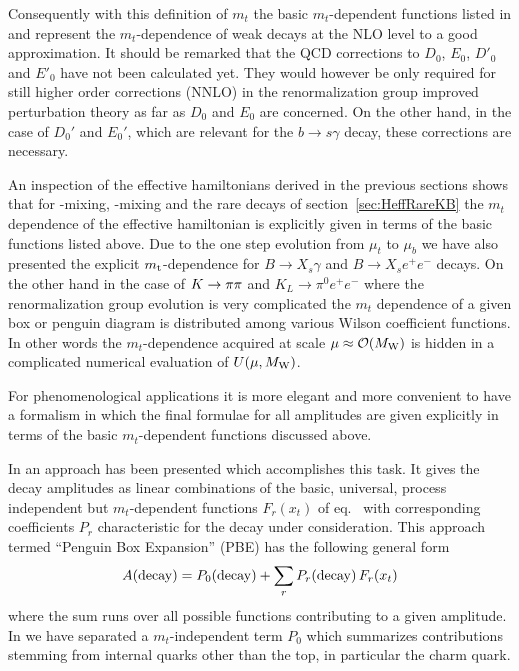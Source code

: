 Consequently with this definition of $m_t$ the basic $m_t$-dependent
functions listed in  and  represent the
$m_t$-dependence of weak decays at the NLO level to a good
approximation.  It should be remarked that the QCD corrections to
$D_0$, $E_0$, $D'_0$ and $E'_0$ have not been calculated yet. They
would however be only required for still higher order corrections
(NNLO) in the renormalization group improved perturbation theory as
far as $D_0$ and $E_0$ are concerned. On the other hand, in the case
of $D_0'$ and $E_0'$, which are relevant for the $b \to s \gamma$ decay,
these corrections are necessary.

An inspection of the effective hamiltonians derived in the previous
sections shows that for \BB-mixing, \KK-mixing and the rare decays of
section~\ref{sec:HeffRareKB} the $m_t$ dependence of the effective
hamiltonian is explicitly given in terms of the basic functions listed
above. Due to the one step evolution from $\mu_t$ to $\mu_b$ we have
also presented the explicit $m_{\rm t}$-dependence for $B \to X_s \gamma$ and
$B \to X_s e^+ e^-$ decays. On the other hand in the case of $K \to \pi\pi$
and $K_L \to \pi^0 e^+ e^-$ where the renormalization group evolution
is very complicated the $m_t$ dependence of a given box or penguin
diagram is distributed among various Wilson coefficient functions. In
other words the $m_t$-dependence acquired at scale $\mu \approx
{\cal O}(M_{\rm W})$ is hidden in a complicated numerical evaluation of
$U(\mu,M_{\rm W})$.

For phenomenological applications it is more elegant and more
convenient to have a formalism in which the final formulae for all
amplitudes are given explicitly in terms of the basic $m_t$-dependent
functions discussed above.

In \cite{buchallaetal:91} an approach has been presented which
accomplishes this task. It gives the decay amplitudes as linear
combinations of the basic, universal, process independent but
$m_t$-dependent functions $F_r(x_t)$ of eq.~ with
corresponding coefficients $P_r$ characteristic for the decay under
consideration. This approach termed ``Penguin Box Expansion'' (PBE) has
the following general form
\begin{equation}
A({\rm decay}) = P_0({\rm decay}) + \sum_r P_r({\rm decay}) \, F_r(x_t)
\label{eq:generalPBE}
\end{equation}
where the sum runs over all possible functions contributing to a given
amplitude. In  we have separated a $m_t$-independent
term $P_0$ which summarizes contributions stemming from internal quarks
other than the top, in particular the charm quark.

